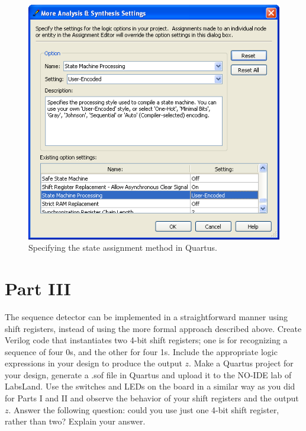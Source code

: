 \documentclass[epsfig,10pt,fullpage]{article}
\begin{document}
\begin{figure}[H]
\centerline{
\includegraphics[scale = 0.75]{figures/figure4.png}}
\caption{Specifying the state assignment method in Quartus.}
\label{fig:fig7_4}
\end{figure}

\section*{Part III}
The sequence detector can be implemented in a straightforward manner using shift registers,
instead of using the more formal approach described above. Create Verilog code that
instantiates two 4-bit shift registers; one is for recognizing a sequence of four 0s, and
the other for four 1s. Include the appropriate logic expressions in your design
to produce the output $z$. Make a Quartus project for your design, generate a .sof file in Quartus and upload it to the NO-IDE lab of LabsLand. Use the switches and LEDs on the board in a similar way as
you did for Parts I and II and observe the behavior of your shift registers and the
output $z$. Answer the following question: could you use just one 4-bit shift
register, rather than two? Explain your answer.

~\newpage
\end{document}
